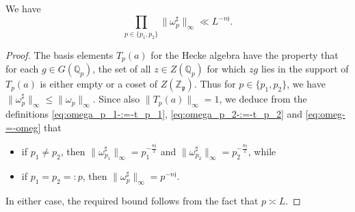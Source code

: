 \begin{lemma}\label{lem:we-have-begin}
  We have
  \begin{equation*}
    \prod_{p \in \{p_1, p_2\}}
    \|\omega_p^\sharp \|_{\infty} \ll L^{-n \mathfrak{j}}.
  \end{equation*}
\end{lemma}
\begin{proof}
  The basis elements $T_p(a)$ for the Hecke algebra have the property that for each $g \in G(\mathbb{Q}_p)$, the set of all $z \in Z(\mathbb{Q}_p)$ for which $z g$ lies in the support of $T_p(a)$ is either empty or a coset of $Z(\mathbb{Z}_\mathfrak{p})$.  Thus for $p \in \{p_1, p_2\}$, we have $\|\omega_p^\sharp \|_{\infty } \leq \|\omega_p\|_{\infty}$.  Since also $\|T_p(a)\|_{\infty} = 1$, we deduce from the definitions \eqref{eq:omega_p_1-:=-t_p_1}, \eqref{eq:omega_p_2-:=-t_p_2} and \eqref{eq:omeg-=-omeg} that
  \begin{itemize}
  \item if $p_1 \neq p_2$, then $\|\omega_{p_1} ^\sharp \|_{\infty} = p_1^{- \frac{n \mathfrak{j}}{2}}$ and $\|\omega_{p_2} ^\sharp \|_{\infty} = p_2^{- \frac{n \mathfrak{j}}{2}}$, while
  \item if $p_1 = p_2 =: p$, then $\|\omega_{p} ^\sharp \|_{\infty} = p^{- n \mathfrak{j}}$.
  \end{itemize}
  In either case, the required bound follows from the fact that $p \asymp L$.
\end{proof}



